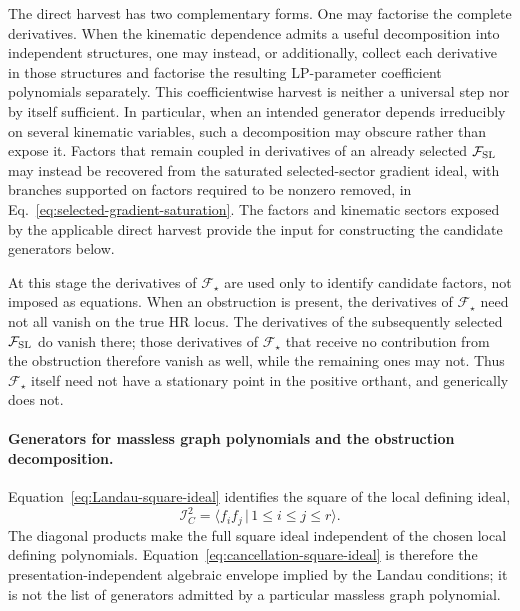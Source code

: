 \documentclass[a4paper,11pt]{article}
\newcommand{\FSL}{\mathcal F_{\rm SL}}
\newcommand{\ideal}{\mathcal I}
\begin{document}
The direct harvest has two complementary forms.  One may factorise the
complete derivatives.  When the kinematic dependence admits a useful
decomposition into independent structures, one may instead, or additionally,
collect each derivative in those structures and factorise the resulting
LP-parameter coefficient polynomials separately.  This coefficientwise
harvest is neither a universal step nor by itself sufficient.  In particular,
when an intended generator depends irreducibly on several kinematic variables,
such a decomposition may obscure rather than expose it.  Factors that remain
coupled in derivatives of an already selected \(\FSL\) may instead be recovered
from the saturated selected-sector gradient ideal, with branches supported
on factors required to be nonzero removed, in
Eq.~\eqref{eq:selected-gradient-saturation}.  The factors and kinematic
sectors exposed by the applicable direct harvest provide the input for
constructing the candidate generators below.

At this stage the derivatives of \(\mathcal F_\star\) are used only to identify
candidate factors, not imposed as equations.  When an obstruction is present,
the derivatives of \(\mathcal F_\star\) need not all vanish on the true HR
locus.  The derivatives of the subsequently selected \(\FSL\) do vanish there;
those derivatives of \(\mathcal F_\star\) that receive no contribution from
the obstruction therefore vanish as well, while the remaining ones may not.
Thus \(\mathcal F_\star\) itself need not have a stationary point in the
positive orthant, and generically does not.

\paragraph{Generators for massless graph polynomials and the obstruction
decomposition.}

Equation~\eqref{eq:Landau-square-ideal} identifies the square of the local
defining ideal,
\begin{equation}
 \ideal_C^2
 =\big\langle f_if_j\,\big|\,1\leq i\leq j\leq r\big\rangle.
 \label{eq:cancellation-square-ideal}
\end{equation}
The diagonal products make the full square ideal independent of the chosen
local defining polynomials.  Equation~\eqref{eq:cancellation-square-ideal} is
therefore the presentation-independent algebraic envelope implied by the Landau
conditions; it is not the list of generators admitted by a particular
massless graph polynomial.
\end{document}
